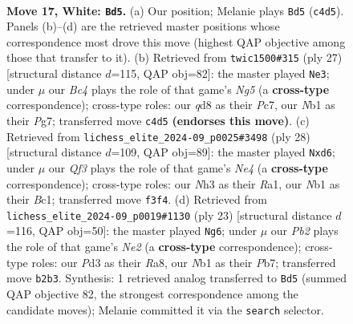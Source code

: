 \documentclass[11pt]{article}
\begin{document}
\clearpage

\begin{figure}[p]\centering
\begin{subfigure}{0.46\textwidth}\centering
\resizebox{\linewidth}{!}{%
\newchessgame
\chessboard[
  setfen={2bq1r2/r3bpkp/p2p1np1/n1p1p3/PpB1P3/3P1Q1N/1PPB1PPP/RN2R1K1 w - - 2 17},
  showmover=false,
  pgfstyle=straightmove, color=movearrow, markmove={c4-d5}
]}
\caption{}
\end{subfigure}\hfill
\begin{subfigure}{0.46\textwidth}\centering
\resizebox{\linewidth}{!}{%
\newchessgame
\chessboard[
  setfen={r3k2r/1pp2ppp/2bqp3/2n5/pbPpPPn1/3P2P1/PP2Q1BP/RNB1NRK1 b kq - 4 14},
  showmover=false,
  pgfstyle=straightmove, color=movearrow, markmove={g4-e3}
]}
\caption{}
\end{subfigure}
\\[4pt]
\begin{subfigure}{0.46\textwidth}\centering
\resizebox{\linewidth}{!}{%
\newchessgame
\chessboard[
  setfen={r1bq1rk1/5pbp/n2pp1p1/p2nP3/Pp1pNP2/1B3N2/1PP3PP/R1BQ1RK1 w - - 0 15},
  showmover=false,
  pgfstyle=straightmove, color=movearrow, markmove={e4-d6}
]}
\caption{}
\end{subfigure}\hfill
\begin{subfigure}{0.46\textwidth}\centering
\resizebox{\linewidth}{!}{%
\newchessgame
\chessboard[
  setfen={r4rk1/pppqnppp/1b1pbn2/4p3/NP2P3/P1PP1N1P/4BPP1/R1BQR1K1 b - - 2 12},
  showmover=false,
  pgfstyle=straightmove, color=movearrow, markmove={e7-g6}
]}
\caption{}
\end{subfigure}
\caption{\textbf{Move 17, White: \texttt{Bd5}.} (a) Our position; Melanie plays \texttt{Bd5} (\texttt{c4d5}). Panels (b)--(d) are the retrieved master positions whose correspondence most drove this move (highest QAP objective among those that transfer to it). (b) Retrieved from \texttt{twic1500\#315} (ply 27) [structural distance $d$=115, QAP obj=82]: the master played \texttt{Ne3}; under $\mu$ our \emph{Bc4} plays the role of that game's \emph{Ng5} (a \textbf{cross-type} correspondence); cross-type roles: our \emph{q}d8 as their \emph{P}c7, our \emph{N}b1 as their \emph{P}g7; transferred move \texttt{c4d5} \textbf{(endorses this move)}. (c) Retrieved from \texttt{lichess\_elite\_2024-09\_p0025\#3498} (ply 28) [structural distance $d$=109, QAP obj=89]: the master played \texttt{Nxd6}; under $\mu$ our \emph{Qf3} plays the role of that game's \emph{Ne4} (a \textbf{cross-type} correspondence); cross-type roles: our \emph{N}h3 as their \emph{R}a1, our \emph{N}b1 as their \emph{B}c1; transferred move \texttt{f3f4}. (d) Retrieved from \texttt{lichess\_elite\_2024-09\_p0019\#1130} (ply 23) [structural distance $d$=116, QAP obj=50]: the master played \texttt{Ng6}; under $\mu$ our \emph{Pb2} plays the role of that game's \emph{Ne2} (a \textbf{cross-type} correspondence); cross-type roles: our \emph{P}d3 as their \emph{R}a8, our \emph{N}b1 as their \emph{P}b7; transferred move \texttt{b2b3}. Synthesis: 1 retrieved analog transferred to \texttt{Bd5} (summed QAP objective 82, the strongest correspondence among the candidate moves); Melanie committed it via the \texttt{search} selector.}
\label{fig:thought-m32}
\end{figure}
\end{document}
